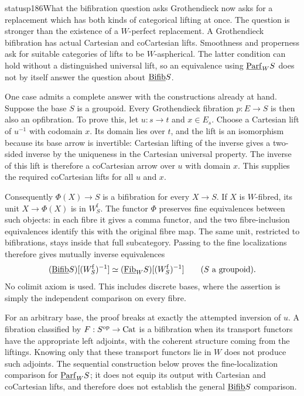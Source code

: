 \begin{dcomment}{status}{p186}{What the bifibration question asks}
Grothendieck now asks for a replacement which has both kinds of categorical lifting at once. The question is stronger than the existence of a $W$-perfect replacement. A Grothendieck bifibration has actual Cartesian and coCartesian lifts. Smoothness and properness ask for suitable categories of lifts to be $W$-aspherical. The latter condition can hold without a distinguished universal lift, so an equivalence using $\underline{\mathrm{Parf}}_W S$ does not by itself answer the question about $\underline{\mathrm{Bifib}} S$.

One case admits a complete answer with the constructions already at hand. Suppose the base $S$ is a groupoid. Every Grothendieck fibration $p:E\to S$ is then also an opfibration. To prove this, let $u:s\to t$ and $x\in E_s$. Choose a Cartesian lift of $u^{-1}$ with codomain $x$. Its domain lies over $t$, and the lift is an isomorphism because its base arrow is invertible: Cartesian lifting of the inverse gives a two-sided inverse by the uniqueness in the Cartesian universal property. The inverse of this lift is therefore a coCartesian arrow over $u$ with domain $x$. This supplies the required coCartesian lifts for all $u$ and $x$.

Consequently $\Phi(X)\to S$ is a bifibration for every $X\to S$. If $X$ is $W$-fibred, its unit $X\to\Phi(X)$ is in $W_S^{\mathrm f}$. The functor $\Phi$ preserves fine equivalences between such objects: in each fibre it gives a comma functor, and the two fibre-inclusion equivalences identify this with the original fibre map. The same unit, restricted to bifibrations, stays inside that full subcategory. Passing to the fine localizations therefore gives mutually inverse equivalences
\[
 (\underline{\mathrm{Bifib}} S)[(W_S^{\mathrm f})^{-1}]
 \simeq (\underline{\mathrm{Fib}}_W S)[(W_S^{\mathrm f})^{-1}]
 \qquad (S\text{ a groupoid}).
\]
No colimit axiom is used. This includes discrete bases, where the assertion is simply the independent comparison on every fibre.

For an arbitrary base, the proof breaks at exactly the attempted inversion of $u$. A fibration classified by $F:S^{\mathrm{op}}\to\mathrm{Cat}$ is a bifibration when its transport functors have the appropriate left adjoints, with the coherent structure coming from the liftings. Knowing only that these transport functors lie in $W$ does not produce such adjoints. The sequential construction below proves the fine-localization comparison for $\underline{\mathrm{Parf}}_W S$; it does not equip its output with Cartesian and coCartesian lifts, and therefore does not establish the general $\underline{\mathrm{Bifib}} S$ comparison.


\end{dcomment}
